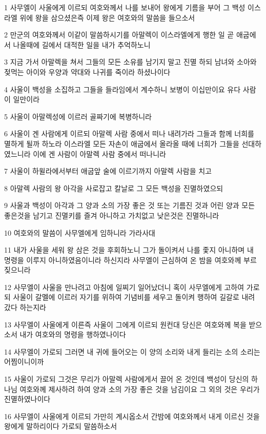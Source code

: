 \par 1 사무엘이 사울에게 이르되 여호와께서 나를 보내어 왕에게 기름을 부어 그 백성 이스라엘 위에 왕을 삼으셨은즉 이제 왕은 여호와의 말씀을 들으소서
\par 2 만군의 여호와께서 이같이 말씀하시기를 아말렉이 이스라엘에게 행한 일 곧 애굽에서 나올때에 길에서 대적한 일을 내가 추억하노니
\par 3 지금 가서 아말렉을 쳐서 그들의 모든 소유를 남기지 말고 진멸 하되 남녀와 소아와 젖먹는 아이와 우양과 약대와 나귀를 죽이라 하셨나이다
\par 4 사울이 백성을 소집하고 그들을 들라임에서 계수하니 보병이 이십만이요 유다 사람이 일만이라
\par 5 사울이 아말렉성에 이르러 골짜기에 복병하니라
\par 6 사울이 겐 사람에게 이르되 아말렉 사람 중에서 떠나 내려가라 그들과 함께 너희를 멸하게 될까 하노라 이스라엘 모든 자손이 애굽에서 올라올 때에 너희가 그들을 선대하였느니라 이에 겐 사람이 아말렉 사람 중에서 떠나니라
\par 7 사울이 하윌라에서부터 애굽앞 술에 이르기까지 아말렉 사람을 치고
\par 8 아말렉 사람의 왕 아각을 사로잡고 칼날로 그 모든 백성을 진멸하였으되
\par 9 사울과 백성이 아각과 그 양과 소의 가장 좋은 것 또는 기름진 것과 어린 양과 모든 좋은것을 남기고 진멸키를 즐겨 아니하고 가치없고 낮은것은 진멸하니라
\par 10 여호와의 말씀이 사무엘에게 임하니라 가라사대
\par 11 내가 사울을 세워 왕 삼은 것을 후회하노니 그가 돌이켜서 나를 좇지 아니하며 내 명령을 이루지 아니하였음이니라 하신지라 사무엘이 근심하여 온 밤을 여호와께 부르짖으니라
\par 12 사무엘이 사울을 만나려고 아침에 일찌기 일어났더니 혹이 사무엘에게 고하여 가로되 사울이 갈멜에 이르러 자기를 위하여 기념비를 세우고 돌이켜 행하여 길갈로 내려 갔다 하는지라
\par 13 사무엘이 사울에게 이른즉 사울이 그에게 이르되 원컨대 당신은 여호와께 복을 받으소서 내가 여호와의 명령을 행하였나이다
\par 14 사무엘이 가로되 그러면 내 귀에 들어오는 이 양의 소리와 내게 들리는 소의 소리는 어찜이니이까
\par 15 사울이 가로되 그것은 무리가 아말렉 사람에게서 끌어 온 것인데 백성이 당신의 하나님 여호와께 제사하려 하여 양과 소의 가장 좋은 것을 남김이요 그 외의 것은 우리가 진멸하였나이다
\par 16 사무엘이 사울에게 이르되 가만히 계시옵소서 간밤에 여호와께서 내게 이르신 것을 왕에게 말하리이다 가로되 말씀하소서
